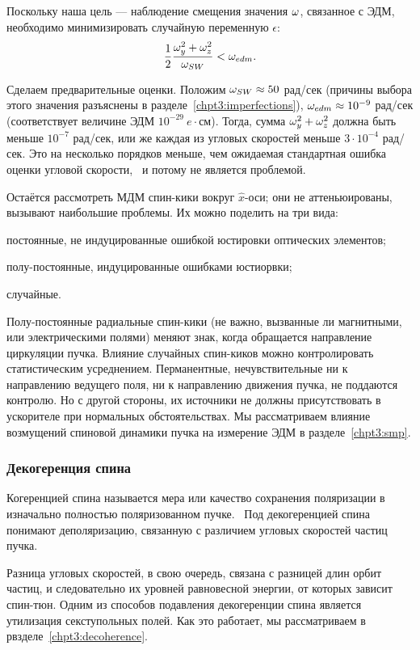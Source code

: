 Поскольку наша цель --- наблюдение смещения значения $\omega$, связанное с ЭДМ, необходимо 
минимизировать случайную переменную $\epsilon$:
\[
\frac12\frac{\omega_y^2+\omega_z^2}{\omega_{SW}} < \omega_{edm}.
\]

Сделаем предварительные оценки. Положим $\omega_{SW}\approx 50$ рад/сек (причины выбора этого значения
разъяснены в разделе~\ref{chpt3:imperfections}), $\omega_{edm}\approx 10^{-9}$ рад/сек (соответствует величине
ЭДМ $10^{-29}~e\cdot$см). Тогда, сумма $\omega_y^2 + \omega_z^2$ должна быть меньше $10^{-7}$ рад/сек, или
же каждая из угловых скоростей меньше $3\cdot 10^{-4}$ рад/сек. Это на несколько порядков меньше,
чем ожидаемая стандартная ошибка оценки угловой скорости,~\cite{Aksentev:Stats} и потому не является проблемой.

Остаётся рассмотреть МДМ спин-кики вокруг $\hat x$-оси; они не аттеньюированы, вызывают наибольшие проблемы.
Их можно поделить на три вида: 
\begin{enumerate*}
	\item постоянные, не индуцированные ошибкой юстировки оптических элементов;
	\item полу-постоянные, индуцированные ошибками юстиорвки;
	\item случайные.
\end{enumerate*}

Полу-постоянные радиальные спин-кики (не важно, вызванные ли магнитными, или электрическими полями) меняют
знак, когда обращается направление циркуляции пучка. Влияние случайных спин-киков можно контролировать 
статистическим усреднением. Перманентные, нечувствительные ни к направлению ведущего поля, ни к направлению
движения пучка, не поддаются контролю. Но с другой стороны, их источники не должны присутствовать в ускорителе
при нормальных обстоятельствах. Мы рассматриваем влияние возмущений спиновой динамики пучка на измерение
ЭДМ в разделе~\ref{chpt3:smp}.

\subsubsection{Декогеренция спина}
Когеренцией спина называется мера или качество сохранения поляризации
в изначально полностью поляризованном пучке.~\cite[стр.~205]{Eremey:Thesis}
Под декогеренцией спина понимают деполяризацию, связанную с различием угловых скоростей 
частиц пучка. 

Разница угловых скоростей, в свою очередь, связана с разницей длин орбит частиц, и следовательно
их уровней равновесной энергии, от которых зависит спин-тюн. Одним из способов подавления декогеренции
спина является утилизация секступольных полей. Как это работает, мы рассматриваем в рвзделе~\ref{chpt3:decoherence}.

